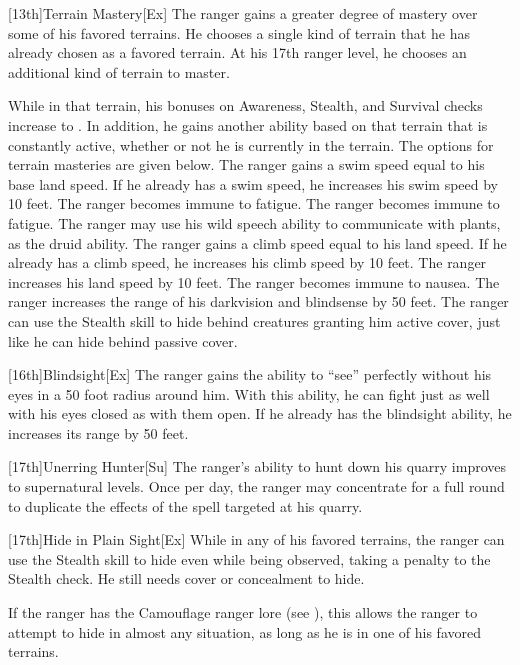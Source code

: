 [13th]{Terrain Mastery}[Ex]
The ranger gains a greater degree of mastery over some of his favored terrains.
He chooses a single kind of terrain that he has already chosen as a favored terrain.
At his 17th ranger level, he chooses an additional kind of terrain to master.
\par While in that terrain, his bonuses on Awareness, Stealth, and Survival checks increase to .
In addition, he gains another ability based on that terrain that is constantly active, whether or not he is currently in the terrain.
The options for terrain masteries are given below.
The ranger gains a swim speed equal to his base land speed.
If he already has a swim speed, he increases his swim speed by 10 feet.
The ranger becomes immune to fatigue.
The ranger becomes immune to fatigue.
The ranger may use his wild speech ability to communicate with plants, as the druid ability.
The ranger gains a climb speed equal to his land speed.
If he already has a climb speed, he increases his climb speed by 10 feet.
The ranger increases his land speed by 10 feet.
The ranger becomes immune to nausea.
The ranger increases the range of his darkvision and blindsense by 50 feet.
The ranger can use the Stealth skill to hide behind creatures granting him active cover, just like he can hide behind passive cover.


[16th]{Blindsight}[Ex]
The ranger gains the ability to ``see'' perfectly without his eyes in a 50 foot radius around him.
With this ability, he can fight just as well with his eyes closed as with them open.
If he already has the blindsight ability, he increases its range by 50 feet.

[17th]{Unerring Hunter}[Su]
The ranger's ability to hunt down his quarry improves to supernatural levels.
Once per day, the ranger may concentrate for a full round to duplicate the effects of the  spell targeted at his quarry.

[17th]{Hide in Plain Sight}[Ex]
While in any of his favored terrains, the ranger can use the Stealth skill to hide even while being observed, taking a  penalty to the Stealth check.
He still needs cover or concealment to hide.

If the ranger has the Camouflage ranger lore (see ), this allows the ranger to attempt to hide in almost any situation, as long as he is in one of his favored terrains.

